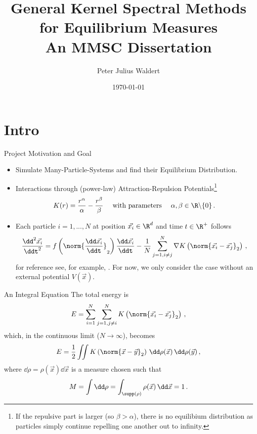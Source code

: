 \documentclass[aspectratio=169, hyperref={colorlinks=true}]{beamer}
\title{General Kernel Spectral Methods for Equilibrium Measures \\ \normalsize An MMSC Dissertation}
\author{Peter Julius Waldert}
\institute{Mathematical Institute \\ University of Oxford}
\date{\today}
\begin{document}
  {\frame{\titlepage}}

  \section{Intro}
   {
    \begin{frame}{Project Motivation and Goal}
      \vspace{0.4cm}
      \begin{itemize}
        \item Simulate Many-Particle-Systems and find their Equilibrium Distribution.
        \item Interactions through (power-law) Attraction-Repulsion Potentials\footnote{If the repulsive part is larger (so $\beta > \alpha$), there is no equilibium distribution as particles simply continue repelling one another out to infinity.}
              $$K(r) = \frac{r^\alpha}{\alpha} - \frac{r^\beta}{\beta}\quad \text{ with parameters } \quad \alpha, \beta \in \R \backslash \{0\}\,.$$
        \item Each particle $i=1, ..., N$ at position $\vec{x_i} \in \R^d$ and time $t \in \R^+$ follows
              $$\frac{\dd^2 \vec{x_i}}{\ddt^2} = f\left(\norm{\frac{\dd \vec{x_i}}{\ddt}}_2\right) \frac{\dd\vec{x_i}}{\ddt} - \frac{1}{N} \sum_{j=1, i\neq j}^{N} \nabla K\left(\norm{\vec{x_i} - \vec{x_j}}_2\right)\,,$$
              for reference see, for example, \parencite{2020-power-law-kernels, 2021-arbitrary-dimensions}.
              For now, we only consider the case without an external potential $V(\vec{x})$.
      \end{itemize}
    \end{frame}
   }

  \begin{frame}{An Integral Equation}
    The total energy is $$E = \sum_{i=1}^{N} \sum_{j=1, j \neq i}^{N} K\left(\norm{\vec{x_i} - \vec{x_j}}_2\right)\,,$$
    which, in the continuous limit ($N \rightarrow \infty$), becomes
    $$E = \frac{1}{2} \iint K\left(\norm{\vec{x} - \vec{y}}_2\right) \,\dd\rho(\vec{x})\,\dd\rho(\vec{y})\,,$$ where $\dd\rho = \rho(\vec{x})\dd\vec{x}$ is a measure chosen such that $$M = \int \dd\rho = \int_{\supp(\rho)} \rho(\vec{x}) \,\dd\vec{x} = 1\,.$$
  \end{frame}
\end{document}

